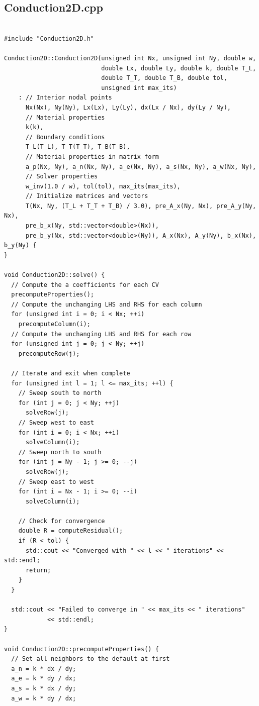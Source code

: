 \documentclass{article}
\begin{document}
\subsection*{Conduction2D.cpp}

\begin{verbatim}

#include "Conduction2D.h"

Conduction2D::Conduction2D(unsigned int Nx, unsigned int Ny, double w,
                           double Lx, double Ly, double k, double T_L,
                           double T_T, double T_B, double tol,
                           unsigned int max_its)
    : // Interior nodal points
      Nx(Nx), Ny(Ny), Lx(Lx), Ly(Ly), dx(Lx / Nx), dy(Ly / Ny),
      // Material properties
      k(k),
      // Boundary conditions
      T_L(T_L), T_T(T_T), T_B(T_B),
      // Material properties in matrix form
      a_p(Nx, Ny), a_n(Nx, Ny), a_e(Nx, Ny), a_s(Nx, Ny), a_w(Nx, Ny),
      // Solver properties
      w_inv(1.0 / w), tol(tol), max_its(max_its),
      // Initialize matrices and vectors
      T(Nx, Ny, (T_L + T_T + T_B) / 3.0), pre_A_x(Ny, Nx), pre_A_y(Ny, Nx),
      pre_b_x(Ny, std::vector<double>(Nx)),
      pre_b_y(Nx, std::vector<double>(Ny)), A_x(Nx), A_y(Ny), b_x(Nx), b_y(Ny) {
}

void Conduction2D::solve() {
  // Compute the a coefficients for each CV
  precomputeProperties();
  // Compute the unchanging LHS and RHS for each column
  for (unsigned int i = 0; i < Nx; ++i)
    precomputeColumn(i);
  // Compute the unchanging LHS and RHS for each row
  for (unsigned int j = 0; j < Ny; ++j)
    precomputeRow(j);

  // Iterate and exit when complete
  for (unsigned int l = 1; l <= max_its; ++l) {
    // Sweep south to north
    for (int j = 0; j < Ny; ++j)
      solveRow(j);
    // Sweep west to east
    for (int i = 0; i < Nx; ++i)
      solveColumn(i);
    // Sweep north to south
    for (int j = Ny - 1; j >= 0; --j)
      solveRow(j);
    // Sweep east to west
    for (int i = Nx - 1; i >= 0; --i)
      solveColumn(i);

    // Check for convergence
    double R = computeResidual();
    if (R < tol) {
      std::cout << "Converged with " << l << " iterations" << std::endl;
      return;
    }
  }

  std::cout << "Failed to converge in " << max_its << " iterations"
            << std::endl;
}

void Conduction2D::precomputeProperties() {
  // Set all neighbors to the default at first
  a_n = k * dx / dy;
  a_e = k * dy / dx;
  a_s = k * dx / dy;
  a_w = k * dy / dx;


\end{verbatim}
\end{document}
